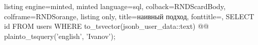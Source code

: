 \begin{frame}[fragile, t]
    \begin{tcblisting}{
      listing engine=minted,
      minted language=sql,
      colback=RNDScardBody,
      colframe=RNDSorange,
      listing only,
      title=наивный подход,
      fonttitle=\normalsize,
    }
SELECT 
  id 
FROM 
  users 
WHERE 
  to_tsvector(jsonb_user_data::text) @@ 
  plainto_tsquery('english', 'Ivanov');
  \end{tcblisting}
\end{frame}
